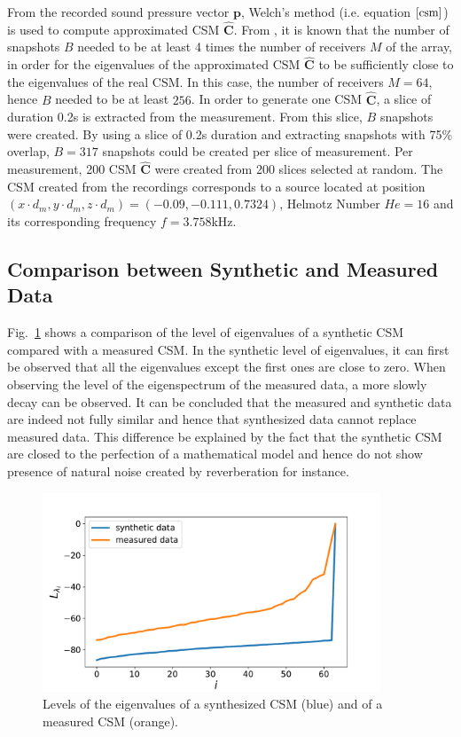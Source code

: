 \documentclass[11pt,a4paper,twoside]{report}
\begin{document}
From the recorded sound pressure vector $\mathbf{p}$, Welch's method (i.e. equation $\ref{csm}$) is used to compute approximated CSM $\hat{\mathbf{C}}$. From \cite{gerstoft2012eigenvalues}, it is known that the number of snapshots $B$ needed to be at least 4 times the number of receivers $M$ of the array, in order for the eigenvalues of the approximated CSM $\hat{\mathbf{C}}$ to be sufficiently close to the eigenvalues of the real CSM. In this case, the number of receivers $M = 64$, hence $B$ needed to be at least $256$. In order to generate one CSM $\hat{\mathbf{C}}$, a slice of duration 0.2s is extracted from the measurement. From this slice, $B$ snapshots were created. By using a slice of 0.2s duration and extracting snapshots with 75\% overlap, $B = 317$ snapshots could be created per slice of measurement. Per measurement, 200 CSM $\hat{\mathbf{C}}$ were created from 200 slices selected at random. The CSM created from the recordings corresponds to a source located at position $(x \cdot d_m,y \cdot d_m, z \cdot d_m) = (-0.09,-0.111, 0.7324)$, Helmotz Number $He = 16$ and its corresponding frequency $f = 3.758$kHz.


\subsection{Comparison between Synthetic and Measured Data}

Fig.~\ref{fig:comparison_synthetic_measurement_data} shows a comparison of the level of eigenvalues of a synthetic CSM compared with a measured CSM. In the synthetic level of eigenvalues, it can first be observed that all the eigenvalues except the first ones are close to zero. When observing the level of the eigenspectrum of the measured data, a more slowly decay can be observed. It can be concluded that the measured and synthetic data are indeed not fully similar and hence that synthesized data cannot replace measured data. This difference be explained by the fact that the synthetic CSM are closed to the perfection of a mathematical model and hence do not show presence of natural noise created by reverberation for instance.

\begin{figure}
    \centering
    \includegraphics[width=0.9\textwidth]{figs/comparison_synthetic_measurement_data.pdf}
    \caption{Levels of the eigenvalues of a synthesized CSM (blue) and of a measured CSM (orange).}
    \label{fig:comparison_synthetic_measurement_data}    
\end{figure}
\end{document}
